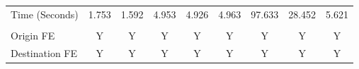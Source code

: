 \begin{tabular}{lcccccccc}
\noalign{\smallskip}Time (Seconds) & 1.753 & 1.592 & 4.953 & 4.926 & 4.963 & 97.633 & 28.452 & 5.621\\
 & \begin{footnotesize}\end{footnotesize} & \begin{footnotesize}\end{footnotesize} & \begin{footnotesize}\end{footnotesize} & \begin{footnotesize}\end{footnotesize} & \begin{footnotesize}\end{footnotesize} & \begin{footnotesize}\end{footnotesize} & \begin{footnotesize}\end{footnotesize} & \begin{footnotesize}\end{footnotesize}\\
\noalign{\smallskip}Origin FE & Y & Y & Y & Y & Y & Y & Y & Y \\
Destination FE & Y & Y & Y & Y & Y & Y & Y & Y \\
\hline\end{tabular}
